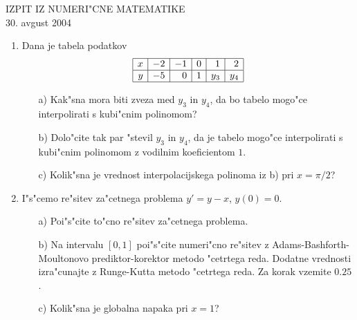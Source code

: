 

\begin{center}
  IZPIT IZ NUMERI"CNE MATEMATIKE\\
  30. avgust 2004
\end{center}
\vspace{1cm}

\begin{enumerate}
  \item Dana je tabela podatkov
    $$\begin{array}{|r|r|r|r|r|r|}
           \hline
	    	x & -2 & -1 & 0 & 1 & 2 \\ \hline
		y & -5 &  0 & 1 & y_3 & y_4\\ \hline
	\end{array}
	$$
	\begin{itemize}
		\item[a)] Kak"sna mora biti zveza med $y_3$ in $y_4$,
		da bo tabelo mogo"ce interpolirati s kubi"cnim polinomom?
		\item [b)]Dolo"cite tak par "stevil $y_3$ in $y_4$,
		da je tabelo mogo"ce interpolirati s kubi"cnim
		polinomom z vodilnim koeficientom $1$.
		\item[c)] Kolik"sna je vrednost interpolacijskega polinoma
		iz b) pri $x=\pi/2$?
								
  \end{itemize}
  \item I"s"cemo re"sitev za"cetnega problema $y'=y-x$, $y(0)=0$.
    \begin{itemize}
    	\item[a)] Poi"s"cite to"cno re"sitev za"cetnega problema.
	\item[b)] Na intervalu $[0,1]$ poi"s"cite numeri"cno re"sitev 
	z Adams-Bashforth-Moultonovo prediktor-korektor metodo "cetrtega 
	reda. Dodatne vrednosti izra"cunajte z Runge-Kutta metodo "cetrtega 
	reda. Za korak vzemite $0.25$.
	\item[c)] Kolik"sna je globalna napaka pri $x=1$?
    \end{itemize}
\end{enumerate}


